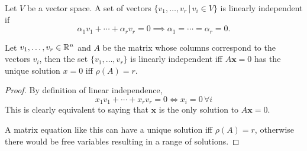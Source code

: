 \documentclass[a4paper,10pt]{article}
\begin{document}
\begin{defn}
	Let $V$ be a vector space. A set of vectors
	$\{v_1, \ldots, v_r \, | \, v_i \in V \}$
	is linearly independent if
	\[
		\alpha_1 v_1 + \cdots + \alpha_r v_r = 0
		\implies \alpha_1 = \cdots = \alpha_r = 0.
	\]
\end{defn}

\begin{thm}
	Let $v_1, \ldots, v_r \in \mathbb{R}^n$ and $A$ be the matrix whose
	columns correspond to the vectors $v_i$, then the set
	$\{v_1, \ldots, v_r\}$ is linearly independent iff
	$A\bm{x} = 0$ has the unique solution $x = 0$ iff $\rho(A) = r$.
\end{thm}

\begin{proof}
	By definition of linear independence,
	\[
		x_1 v_1 + \cdots + x_r v_r = 0
		\iff
		x_i = 0 \, \forall i
	\]
	This is clearly equivalent to saying that $\bm x$ is the
	only solution to $A\bm x = 0$.

	A matrix equation like this can have a unique solution iff
	$\rho(A) = r$, otherwise there would be free variables resulting
	in a range of solutions.
\end{proof}
\end{document}
